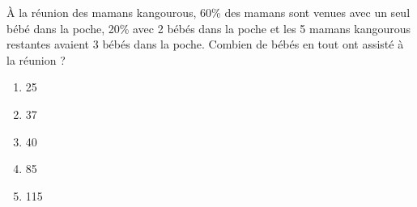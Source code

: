 \`A la réunion des mamans kangourous, 60\% des mamans sont venues avec
un seul bébé dans la poche, 20\% avec 2 bébés dans la poche et les 5
mamans kangourous restantes avaient 3 bébés dans la poche. Combien de
bébés en tout ont assisté à la réunion ?
\begin{multicols}{5}
  \begin{enumerate}[A/]
  \item 25
  \item 37
  \item 40
  \item 85
  \item 115
  \end{enumerate}
\end{multicols}